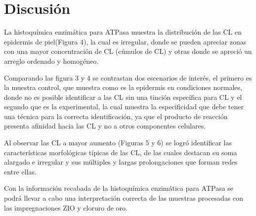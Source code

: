
\vspace{-0.5cm}
\section*{Discusión}

La histoquímica enzimática para ATPasa muestra la distribución de las CL en epidermis de piel(Figura 4), la cual es irregular, donde se pueden apreciar zonas con una mayor concentración de CL (cúmulos de CL) y otras donde se apreció un arreglo ordenado y homogéneo.

Comparando las figura 3 y 4 se contrastan dos escenarios de interés, el primero es la muestra control, que muestra como es la epidermis en condiciones normales, donde no es posible identificar a las CL sin una tinción específica para CL y el segundo que es la experimental, la cual muestra la especificidad que debe tener una técnica para la correcta identificación, ya que el producto de reacción presenta afinidad hacia las CL y no a otros componentes celulares.

Al observar las CL a mayor aumento (Figuras 5 y 6) se logró identificar las características morfológicas típicas de las CL, de las cuales destacan su soma alargado e irregular y sus múltiples y largas prolongaciones que forman redes entre ellas.

Con la información recabada de la histoquímica enzimática para ATPasa se podrá llevar a cabo una interpretación correcta de las muestras procesadas con las impregnaciones ZIO y cloruro de oro.

